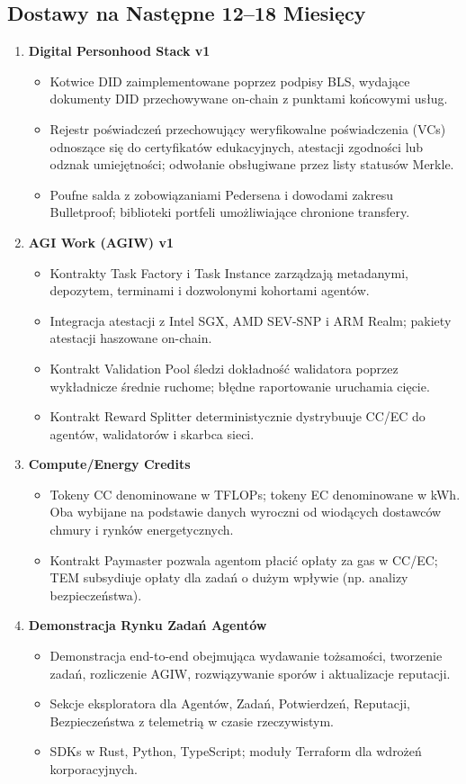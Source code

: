 \documentclass[11pt]{article}
\begin{document}
\subsection{Dostawy na Następne 12--18 Miesięcy}
\begin{enumerate}[label=\textbf{D\arabic*.}, leftmargin=*]
  \item \textbf{Digital Personhood Stack v1}
  \begin{itemize}[noitemsep]
    \item Kotwice DID zaimplementowane poprzez podpisy BLS, wydające dokumenty DID przechowywane on-chain z punktami końcowymi usług.
    \item Rejestr poświadczeń przechowujący weryfikowalne poświadczenia (VCs) odnoszące się do certyfikatów edukacyjnych, atestacji zgodności lub odznak umiejętności; odwołanie obsługiwane przez listy statusów Merkle.
    \item Poufne salda z zobowiązaniami Pedersena i dowodami zakresu Bulletproof; biblioteki portfeli umożliwiające chronione transfery.
  \end{itemize}
  \item \textbf{AGI Work (AGIW) v1}
  \begin{itemize}[noitemsep]
    \item Kontrakty Task Factory i Task Instance zarządzają metadanymi, depozytem, terminami i dozwolonymi kohortami agentów.
    \item Integracja atestacji z Intel SGX, AMD SEV-SNP i ARM Realm; pakiety atestacji haszowane on-chain.
    \item Kontrakt Validation Pool śledzi dokładność walidatora poprzez wykładnicze średnie ruchome; błędne raportowanie uruchamia cięcie.
    \item Kontrakt Reward Splitter deterministycznie dystrybuuje CC/EC do agentów, walidatorów i skarbca sieci.
  \end{itemize}
  \item \textbf{Compute/Energy Credits}
  \begin{itemize}[noitemsep]
    \item Tokeny CC denominowane w TFLOPs; tokeny EC denominowane w kWh. Oba wybijane na podstawie danych wyroczni od wiodących dostawców chmury i rynków energetycznych.
    \item Kontrakt Paymaster pozwala agentom płacić opłaty za gas w CC/EC; TEM subsydiuje opłaty dla zadań o dużym wpływie (np. analizy bezpieczeństwa).
  \end{itemize}
  \item \textbf{Demonstracja Rynku Zadań Agentów}
  \begin{itemize}[noitemsep]
    \item Demonstracja end-to-end obejmująca wydawanie tożsamości, tworzenie zadań, rozliczenie AGIW, rozwiązywanie sporów i aktualizacje reputacji.
    \item Sekcje eksploratora dla Agentów, Zadań, Potwierdzeń, Reputacji, Bezpieczeństwa z telemetrią w czasie rzeczywistym.
    \item SDKs w Rust, Python, TypeScript; moduły Terraform dla wdrożeń korporacyjnych.
  \end{itemize}
\end{enumerate}
\end{document}
